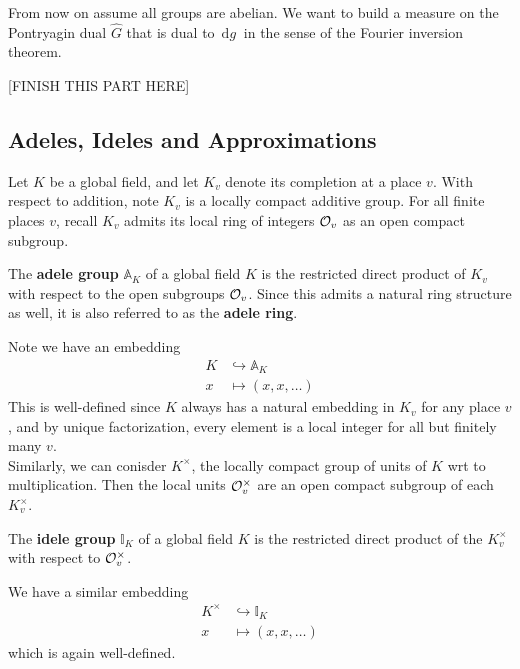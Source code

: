 \documentclass[11pt, x11names]{book}
\renewcommand{\aa}{\mathbb{A}}
\newcommand{\ii}{\mathbb{I}}
\newcommand{\inj}{\hookrightarrow}
\renewcommand{\hat}{\widehat}
\newcommand{\dg}{\, \mathrm{d}g \ }
\begin{document}
From now on assume all groups are abelian. We want to build a measure on the Pontryagin dual $\hat{G}$ that is dual to $\dg$ in the sense of the Fourier inversion theorem.

[FINISH THIS PART HERE]


\subsection{Adeles, Ideles and Approximations}
\label{subsection: Approximation theorem Adeles}

Let $K$ be a global field, and let $K_v$ denote its completion at a place $v$. With respect to addition, note $K_v$ is a locally compact additive group. For all finite places $v$, recall $K_v$ admits its local ring of integers $\mathcal{O}_v$ as an open compact subgroup.

\begin{defn}
    The \textbf{adele group} $\aa_K$ of a global field $K$ is the restricted direct product of $K_v$ with respect to the open subgroups $\mathcal{O}_v$. Since this admits a natural ring structure as well, it is also referred to as the \textbf{adele ring}.
\end{defn}

Note we have an embedding
\begin{equation*}
\begin{split}
    K & \inj \aa_K\\
    x &\mapsto (x, x, \ldots)
\end{split}
\end{equation*}
This is well-defined since $K$ always has a natural embedding in $K_v$ for any place $v$, and by unique factorization, every element is a local integer for all but finitely many $v$.\\

Similarly, we can conisder $K^\times$, the locally compact group of units of $K$ wrt to multiplication. Then the local units $\mathcal{O}_v^\times$ are an open compact subgroup of each $K_v^\times$.
\begin{defn}
The \textbf{idele group} $\ii_K$ of a global field $K$ is the restricted direct product of the $K_v^\times$ with respect to $\mathcal{O}_v^\times$.
\end{defn}

We have a similar embedding
\begin{equation*}
    \begin{split}
    K^\times &\inj \ii_K\\
    x &\mapsto (x, x, \ldots)
    \end{split}
\end{equation*}
which is again well-defined.
\end{document}
